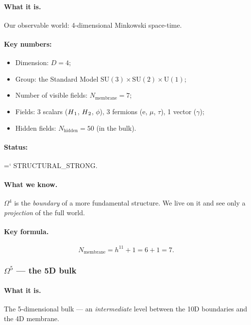 \documentclass[11pt,a4paper]{article}
\newcommand{\SU}{\mathrm{SU}}
\newcommand{\Om}{\Omega^4}
\newcommand{\Omf}{\Omega^5}
\newcommand{\Nhidden}{N_{\text{hidden}}}
\newcommand{\Nmembrane}{N_{\text{membrane}}}
\newcommand{\Hone}{H\textsubscript{1}}
\newcommand{\Htwo}{H\textsubscript{2}}
\renewcommand{\texttt}[1]{{\ttfamily\hyphenchar\font=`\- #1}}
\theoremstyle{definition}
\begin{document}
\paragraph{What it is.}
Our observable world: 4-dimensional Minkowski space-time.

\paragraph{Key numbers:}
\begin{itemize}
    \item Dimension: $D = 4$;
    \item Group: the Standard Model 
          $\SU(3) \times \SU(2) \times \mathrm{U}(1)$;
    \item Number of visible fields: $\Nmembrane = 7$;
    \item Fields: 3 scalars ($\Hone$, $\Htwo$, $\phi$), 3 fermions 
          (e, $\mu$, $\tau$), 1 vector ($\gamma$);
    \item Hidden fields: $\Nhidden = 50$ (in the bulk).
\end{itemize}

\paragraph{Status:} \texttt{STRUCTURAL\_STRONG}.

\paragraph{What we know.}
$\Om$ is the \emph{boundary} of a more fundamental structure. 
We live on it and see only a \emph{projection} of the full world.

\paragraph{Key formula.}
\begin{equation}
    \Nmembrane = h^{11} + 1 = 6 + 1 = 7.
\end{equation}

\subsubsection{$\Omf$ — the 5D bulk}

\paragraph{What it is.}
The 5-dimensional bulk — an \emph{intermediate} level between the 10D 
boundaries and the 4D membrane.
\end{document}
